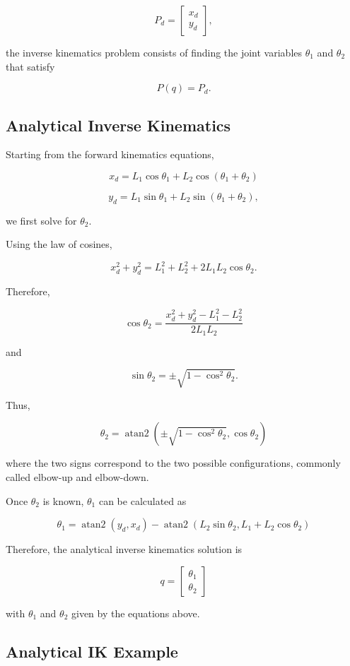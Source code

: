 \documentclass{article}
\begin{document}
\[
P_d =
\begin{bmatrix}
x_d\\
y_d
\end{bmatrix},
\]

the inverse kinematics problem consists of finding the joint
variables $\theta_1$ and $\theta_2$ that satisfy

\[
P(q) = P_d.
\]


\subsection{Analytical Inverse Kinematics}

Starting from the forward kinematics equations,

\[
x_d =
L_1\cos\theta_1
+
L_2\cos(\theta_1+\theta_2)
\]

\[
y_d =
L_1\sin\theta_1
+
L_2\sin(\theta_1+\theta_2),
\]

we first solve for $\theta_2$.

Using the law of cosines,

\[
x_d^2+y_d^2
=
L_1^2+L_2^2
+
2L_1L_2\cos\theta_2.
\]

Therefore,

\[
\boxed{
\cos\theta_2
=
\frac{x_d^2+y_d^2-L_1^2-L_2^2}
{2L_1L_2}
}
\]

and

\[
\sin\theta_2
=
\pm\sqrt{1-\cos^2\theta_2}.
\]

Thus,

\[
\boxed{
\theta_2
=
\operatorname{atan2}
\left(
\pm\sqrt{1-\cos^2\theta_2},
\cos\theta_2
\right)
}
\]

where the two signs correspond to the two possible configurations,
commonly called elbow-up and elbow-down.

Once $\theta_2$ is known, $\theta_1$ can be calculated as

\[
\boxed{
\theta_1
=
\operatorname{atan2}(y_d,x_d)
-
\operatorname{atan2}
\left(
L_2\sin\theta_2,
L_1+L_2\cos\theta_2
\right)
}
\]

Therefore, the analytical inverse kinematics solution is

\[
\boxed{
q =
\begin{bmatrix}
\theta_1\\
\theta_2
\end{bmatrix}
}
\]

with $\theta_1$ and $\theta_2$ given by the equations above.


\subsection{Analytical IK Example}
\end{document}
